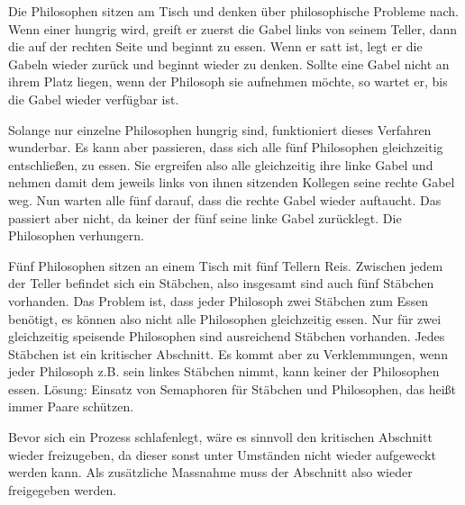 \begin{answer}
Die Philosophen sitzen am Tisch und denken über philosophische Probleme nach. Wenn einer hungrig wird, greift er zuerst die Gabel links von seinem Teller, dann die auf der rechten Seite und beginnt zu essen. Wenn er satt ist, legt er die Gabeln wieder zurück und beginnt wieder zu denken. Sollte eine Gabel nicht an ihrem Platz liegen, wenn der Philosoph sie aufnehmen möchte, so wartet er, bis die Gabel wieder verfügbar ist.

Solange nur einzelne Philosophen hungrig sind, funktioniert dieses Verfahren wunderbar. Es kann aber passieren, dass sich alle fünf Philosophen gleichzeitig entschließen, zu essen. Sie ergreifen also alle gleichzeitig ihre linke Gabel und nehmen damit dem jeweils links von ihnen sitzenden Kollegen seine rechte Gabel weg. Nun warten alle fünf darauf, dass die rechte Gabel wieder auftaucht. Das passiert aber nicht, da keiner der fünf seine linke Gabel zurücklegt. Die Philosophen verhungern.
\end{answer}

\begin{answer}
Fünf Philosophen sitzen an einem Tisch mit fünf Tellern Reis. Zwischen jedem der Teller befindet
sich ein Stäbchen, also insgesamt sind auch fünf Stäbchen vorhanden. Das Problem ist, dass jeder Philosoph zwei Stäbchen zum Essen benötigt, es können also nicht alle Philosophen gleichzeitig essen. Nur für zwei gleichzeitig speisende Philosophen sind ausreichend Stäbchen vorhanden.
Jedes Stäbchen ist ein kritischer Abschnitt. Es kommt aber zu Verklemmungen, wenn jeder Philosoph z.B. sein linkes Stäbchen nimmt, kann keiner der Philosophen essen.
Lösung: Einsatz von Semaphoren für Stäbchen und Philosophen, das heißt immer Paare schützen.
\end{answer}

\begin{answer}
Bevor sich ein Prozess schlafenlegt, wäre es sinnvoll den kritischen Abschnitt wieder freizugeben, da dieser sonst unter Umständen nicht wieder aufgeweckt werden kann. Als zusätzliche Massnahme muss der Abschnitt also wieder freigegeben werden.
\end{answer}

